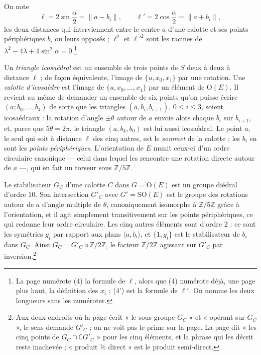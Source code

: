 \documentclass[11pt,a4paper]{article}
\begin{document}
On note
\[
\ell = 2\sin\frac{\alpha}{2} = \|a - b_i\|,\qquad \ell' = 2\cos\frac{\alpha}{2} = \|a + b_i\|,
\]
les deux distances qui interviennent entre le centre $a$ d'une calotte et ses
points périphériques $b_i$ ou leurs opposés ; $\ell^{2}$ et $\ell'^{2}$ sont
les racines de $\lambda^{2} - 4\lambda + 4\sin^{2}\alpha = 0$.\footnote{La page
numérote (4) la formule de $\ell$, alors que (4) numérote déjà, une page plus
haut, la définition des $x_i$ ; (4') est la formule de $\ell'$. On nomme les
deux longueurs sans les numéroter.}

Un \emph{triangle icosaédral} est un ensemble de trois points de $S$ deux à
deux à distance $\ell$ ; de façon équivalente, l'image de $\{u, x_0, x_1\}$
par une rotation. Une \emph{calotte d'icosaèdre} est l'image de
$\{u, x_0, \ldots, x_4\}$ par un élément de $\mathrm{O}(E)$. Il revient au
même de demander un ensemble de six points qu'on puisse écrire
$(a; b_0, \ldots, b_4)$ de sorte que les triangles $(a, b_i, b_{i+1})$,
$0 \leqslant i \leqslant 3$, soient icosaédraux : la rotation d'angle $\pm\theta$
autour de $a$ envoie alors chaque $b_i$ sur $b_{i+1}$, et, parce que
$5\theta = 2\pi$, le triangle $(a, b_4, b_0)$ est lui aussi icosaédral. Le
point $a$, le seul qui soit à distance $\ell$ des cinq autres, est le
\emph{sommet} de la calotte ; les $b_i$ en sont les \emph{points
périphériques}. L'orientation de $E$ munit ceux-ci d'un ordre circulaire
canonique --- celui dans lequel les rencontre une rotation directe autour de
$a$ ---, qui en fait un torseur sous $\mathbb{Z}/5\mathbb{Z}$.

Le stabilisateur $G_C$ d'une calotte $C$ dans $G = \mathrm{O}(E)$ est un
groupe diédral d'ordre $10$. Son intersection $G'_C$ avec
$G' = \mathrm{SO}(E)$ est le groupe des rotations autour de $a$ d'angle
multiple de $\theta$, canoniquement isomorphe à $\mathbb{Z}/5\mathbb{Z}$ grâce
à l'orientation, et il agit simplement transitivement sur les points
périphériques, ce qui redonne leur ordre circulaire. Les cinq autres éléments
sont d'ordre $2$ : ce sont les symétries $g_i$ par rapport aux plans
$\langle a, b_i \rangle$, et $\{1, g_i\}$ est le stabilisateur de $b_i$ dans
$G_C$. Ainsi $G_C = G'_C \rtimes \mathbb{Z}/2\mathbb{Z}$, le facteur
$\mathbb{Z}/2\mathbb{Z}$ agissant sur $G'_C$ par
inversion.\footnote{Aux deux endroits où la page écrit « le sous-groupe
$G_C$ » et « opérant sur $G_C$ », le sens demande $G'_C$ ; on ne voit pas le
prime sur la page. La page dit « les cinq points de
$G_C \cap \complement G'_C$ » pour les cinq éléments, et la phrase qui les
décrit reste inachevée ; « produit ½ direct » est le produit semi-direct.}
\end{document}
